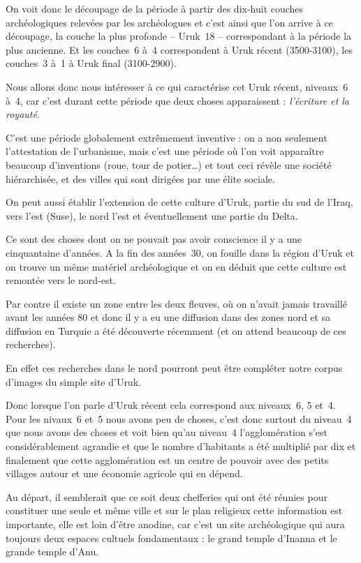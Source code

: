\documentclass[a4paper,10pt]{article}
\begin{document}
On voit donc le découpage de la période à partir des dix-huit couches 
archéologiques relevées par les archéologues et c'est ainsi que l'on 
arrive à ce découpage, la couche la plus profonde -- Uruk~18 -- 
correspondant à la période la plus ancienne.
Et les couches~6 à~4 correspondent à Uruk récent (3500-3100), 
les couches~3 à~1 à Uruk final (3100-2900).

Nous allons donc nous intéresser à ce qui caractérise cet Uruk récent, 
niveaux~6 à~4, car c'est durant cette période que deux choses apparaissent : 
\emph{l'écriture et la royauté}.

C'est une période globalement extrêmement inventive : on a non seulement 
l'attestation de l'urbanisme, mais c'est une période où l'on voit apparaître 
beaucoup d'inventions (roue, tour de potier\dots) et tout ceci révèle une 
société hiérarchisée, et des villes qui sont dirigées par une élite sociale.

On peut aussi établir l'extension de cette culture d'Uruk, partie du sud 
de l'Iraq, vers l'est (Suse), le nord l'est et éventuellement une partie 
du Delta.

Ce sont des choses dont on ne pouvait pas avoir conscience il y a une 
cinquantaine d'années. A la fin des années~30, on fouille dans la région 
d'Uruk et on trouve un même matériel archéologique et on en déduit que 
cette culture est remontée vers le nord-est.

Par contre il existe un zone entre les deux fleuves, où on n'avait jamais 
travaillé avant les années 80 et donc il y a eu une diffusion dans des 
zones nord et sa diffusion en Turquie a été découverte récemment (et on 
attend beaucoup de ces recherches).

En effet ces recherches dans le nord pourront peut être compléter notre 
corpus d'images du simple site d'Uruk.

Donc lorsque l'on parle d'Uruk récent cela correspond aux niveaux~6, 
5 et~4. Pour les nivaux~6 et~5 nous avons peu de choses, c'est donc 
surtout du niveau~4 que nous avons des choses et voit bien qu'au niveau~4 
l'agglomération s'est considérablement agrandie et que le nombre d'habitants 
a été multiplié par dix et finalement que cette agglomération est un centre 
de pouvoir avec des petits villages autour et une économie agricole qui 
en dépend.

Au départ, il semblerait que ce soit deux chefferies qui ont été réunies 
pour constituer une seule et même ville et sur le plan religieux cette 
information est importante, elle est loin d'être anodine, car c'est un 
site archéologique qui aura toujours deux espaces cultuels fondamentaux : 
le grand temple d'Inanna et le grande temple d'Anu.
\end{document}

